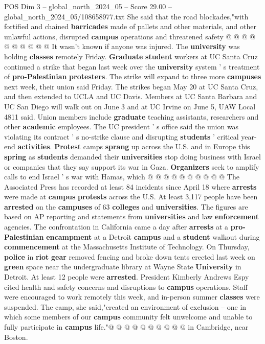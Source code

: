 \begin{textsample}{POS Dim 3 – global\_north\_2024\_05 – Score 29.00 – global\_north\_2024\_05/108658977.txt}
She said that the road blockades,"with fortified and chained \textbf{barricades} made of pallets and other materials, and other unlawful actions, disrupted \textbf{campus} operations and threatened safety @ @ @ @ @ @ @ @ @ @ It wasn't known if anyone was injured.
The \textbf{university} was holding \textbf{classes} remotely Friday. \textbf{Graduate} \textbf{student} workers at UC Santa Cruz continued a strike that began last week over the \textbf{university} system ' s treatment of \textbf{pro-Palestinian} \textbf{protesters}.
The strike will expand to three more \textbf{campuses} next week, their union said Friday.
The strikes began May 20 at UC Santa Cruz, and then extended to UCLA and UC Davis.
Members at UC Santa Barbara and UC San Diego will walk out on June 3 and at UC Irvine on June 5, UAW Local 4811 said.
Union members include \textbf{graduate} teaching assistants, researchers and other \textbf{academic} employees.
The UC president ' s office said the union was violating its contract ' s no-strike clause and disrupting \textbf{students} ' critical year-end \textbf{activities}. \textbf{Protest} camps \textbf{sprang} up across the U.S. and in Europe this \textbf{spring} as \textbf{students} demanded their \textbf{universities} stop doing business with Israel or companies that they say support its war in Gaza. \textbf{Organizers} seek to amplify calls to end Israel ' s war with Hamas, which @ @ @ @ @ @ @ @ @ @ The Associated Press has recorded at least 84 incidents since April 18 where \textbf{arrests} were made at \textbf{campus} \textbf{protests} across the U.S.
At least 3,117 people have been \textbf{arrested} on the \textbf{campuses} of 63 \textbf{colleges} and \textbf{universities}.
The figures are based on AP reporting and statements from \textbf{universities} and law \textbf{enforcement} agencies.
The confrontation in California came a day after \textbf{arrests} at a \textbf{pro-Palestinian} \textbf{encampment} at a Detroit \textbf{campus} and a \textbf{student} walkout during \textbf{commencement} at the Massachusetts Institute of Technology.
On Thursday, \textbf{police} in \textbf{riot} \textbf{gear} removed fencing and broke down tents erected last week on \textbf{green} space near the undergraduate library at Wayne State \textbf{University} in Detroit.
At least 12 people were \textbf{arrested}.
President Kimberly Andrews Espy cited health and safety concerns and disruptions to \textbf{campus} operations.
Staff were encouraged to work remotely this week, and in-person summer \textbf{classes} were suspended.
The camp, she said,"created an environment of exclusion -- one in which some members of our \textbf{campus} community felt unwelcome and unable to fully participate in \textbf{campus} life."@ @ @ @ @ @ @ @ @ @ in Cambridge, near Boston.

\end{textsample}
